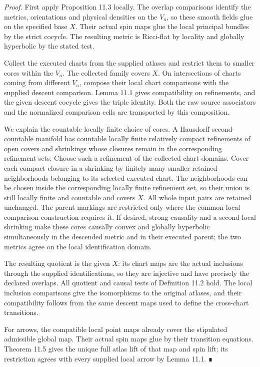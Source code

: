 \documentclass[
  english,
  11pt,
  reqno]{amsart}
\begin{document}
\emph{Proof.} First apply Proposition 11.3 locally. The overlap
comparisons identify the metrics, orientations and physical densities on
the \(V_a\), so these smooth fields glue on the specified base \(X\).
Their actual spin maps glue the local principal bundles by the strict
cocycle. The resulting metric is Ricci-flat by locality and globally
hyperbolic by the stated test.

Collect the executed charts from the supplied atlases and restrict them
to smaller cores within the \(V_a\). The collected family covers \(X\).
On intersections of charts coming from different \(V_a\), compose their
local chart comparisons with the supplied descent comparison. Lemma 11.1
gives compatibility on refinements, and the given descent cocycle gives
the triple identity. Both the raw source associators and the normalized
comparison cells are transported by this composition.

We explain the countable locally finite choice of cores. A Hausdorff
second-countable manifold has countable locally finite relatively
compact refinements of open covers and shrinkings whose closures remain
in the corresponding refinement sets. Choose such a refinement of the
collected chart domains. Cover each compact closure in a shrinking by
finitely many smaller retained neighborhoods belonging to its selected
executed chart. The neighborhoods can be chosen inside the corresponding
locally finite refinement set, so their union is still locally finite
and countable and covers \(X\). All whole input pairs are retained
unchanged. The parent markings are restricted only where the common
local comparison construction requires it. If desired, strong causality
and a second local shrinking make these cores causally convex and
globally hyperbolic simultaneously in the descended metric and in their
executed parent; the two metrics agree on the local identification
domain.

The resulting quotient is the given \(X\): its chart maps are the actual
inclusions through the supplied identifications, so they are injective
and have precisely the declared overlaps. All quotient and causal tests
of Definition 11.2 hold. The local inclusion comparisons give the
isomorphisms to the original atlases, and their compatibility follows
from the same descent maps used to define the cross-chart transitions.

For arrows, the compatible local point maps already cover the stipulated
admissible global map. Their actual spin maps glue by their transition
equations. Theorem 11.5 gives the unique full atlas lift of that map and
spin lift; its restriction agrees with every supplied local arrow by
Lemma 11.1. ∎
\end{document}

